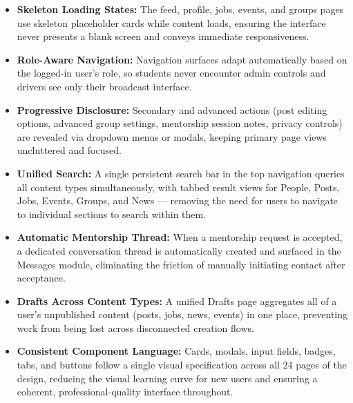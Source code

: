 \documentclass[12pt, a4paper]{article}
\begin{document}
\begin{itemize}
    \item \textbf{Skeleton Loading States:} The feed, profile, jobs, events, and
    groups pages use skeleton placeholder cards while content loads, ensuring the
    interface never presents a blank screen and conveys immediate responsiveness.

    \item \textbf{Role-Aware Navigation:} Navigation surfaces adapt automatically
    based on the logged-in user's role, so students never encounter admin controls
    and drivers see only their broadcast interface.

    \item \textbf{Progressive Disclosure:} Secondary and advanced actions (post
    editing options, advanced group settings, mentorship session notes, privacy
    controls) are revealed via dropdown menus or modals, keeping primary page views
    uncluttered and focused.

    \item \textbf{Unified Search:} A single persistent search bar in the top
    navigation queries all content types simultaneously, with tabbed result views
    for People, Posts, Jobs, Events, Groups, and News --- removing the need for
    users to navigate to individual sections to search within them.

    \item \textbf{Automatic Mentorship Thread:} When a mentorship request is
    accepted, a dedicated conversation thread is automatically created and surfaced
    in the Messages module, eliminating the friction of manually initiating contact
    after acceptance.

    \item \textbf{Drafts Across Content Types:} A unified Drafts page aggregates
    all of a user's unpublished content (posts, jobs, news, events) in one place,
    preventing work from being lost across disconnected creation flows.

    \item \textbf{Consistent Component Language:} Cards, modals, input fields,
    badges, tabs, and buttons follow a single visual specification across all 24
    pages of the design, reducing the visual learning curve for new users and
    ensuring a coherent, professional-quality interface throughout.
\end{itemize}

\clearpage
\end{document}
